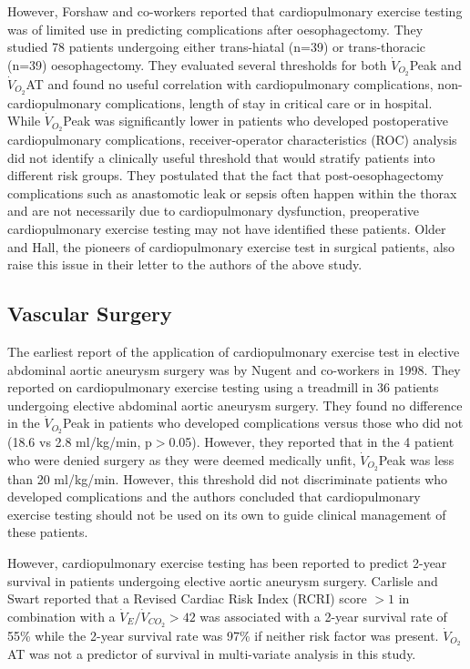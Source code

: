 However, Forshaw and co-workers reported that cardiopulmonary exercise testing was of limited use in predicting complications after oesophagectomy.\parencite{forshaw_is_2008} They studied 78 patients undergoing either trans-hiatal (n=39) or trans-thoracic (n=39) oesophagectomy. They evaluated several thresholds for both $\dot{V}_{O_2}$Peak and $\dot{V}_{O_2}$AT and found no useful correlation with cardiopulmonary complications, non-cardiopulmonary complications, length of stay in critical care or in hospital. While $\dot{V}_{O_2}$Peak was significantly lower in patients who developed postoperative cardiopulmonary complications, receiver-operator characteristics (ROC) analysis did not identify a clinically useful threshold that would stratify patients into different risk groups. They postulated that the fact that post-oesophagectomy complications such as anastomotic leak or sepsis often happen within the thorax and are not necessarily due to cardiopulmonary dysfunction, preoperative cardiopulmonary exercise testing may not have identified these patients. Older and Hall, the pioneers of cardiopulmonary exercise test in surgical patients, also raise this issue in their letter to the authors of the above study. \parencite{hall_cardiopulmonary_2009}

\subsection{Vascular Surgery}
The earliest report of the application of cardiopulmonary exercise test in elective abdominal aortic aneurysm surgery was by Nugent and co-workers in 1998. They reported on cardiopulmonary exercise testing using a treadmill in 36 patients undergoing elective abdominal aortic aneurysm surgery. They found no difference in the $\dot{V}_{O_2}$Peak in patients who developed complications versus those who did not (18.6 vs 2.8 ml/kg/min, p$>$0.05). However, they reported that in the 4 patient who were denied surgery as they were deemed medically unfit, $\dot{V}_{O_2}$Peak was less than 20 ml/kg/min. However, this threshold did not discriminate patients who developed complications and the authors concluded that cardiopulmonary exercise testing should not be used on its own to guide clinical management of these patients.\parencite{nugent_cardiopulmonary_1998}

However, cardiopulmonary exercise testing has been reported to predict 2-year survival in patients undergoing elective aortic aneurysm surgery. Carlisle and Swart reported that a Revised Cardiac Risk Index (RCRI) score $>1$ in combination with a $\dot{V}_E/\dot{V}_{CO_2}>42$ was associated with a 2-year survival rate of 55\% while the 2-year survival rate was 97\% if neither risk factor was present. $\dot{V}_{O_2}$AT was not a predictor of survival in multi-variate analysis in this study.\parencite{carlisle_mid-term_2007}

